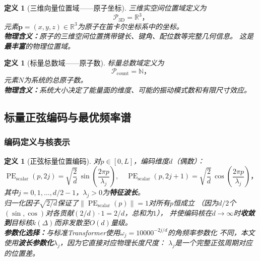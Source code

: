 \documentclass[11pt,a4paper]{article}
\newtheorem{definition}[theorem]{定义}
\theoremstyle{remark}
\DeclareMathOperator{\PE}{PE}
\newcommand{\R}{\mathbb{R}}
\newcommand{\N}{\mathbb{N}}
\newcommand{\Ppos}{\mathcal{P}}
\begin{document}
\begin{definition}[三维向量位置域——原子坐标]
\label{def:1.1.2}
三维实空间位置域定义为
\begin{equation}
    \Ppos_{\text{3D}} = \R^3，
\end{equation}
元素$\mathbf{p} = (x, y, z) \in \R^3$为原子在笛卡尔坐标系中的坐标。\\
\textbf{物理含义：}原子的三维空间位置携带键长、键角、配位数等完整几何信息。
这是\textbf{最丰富}的物理位置域。
\end{definition}

\begin{definition}[标量总数域——原子数]
\label{def:1.1.3}
标量总数域定义为
\begin{equation}
    \Ppos_{\text{count}} = \N，
\end{equation}
元素$N$为系统的总原子数。\\
\textbf{物理含义：}系统大小决定了能量面的维度、可能的振动模式数和有限尺寸效应。
\end{definition}

\subsection{标量正弦编码与最优频率谱}

\subsubsection{编码定义与核表示}

\begin{definition}[正弦标量位置编码]
\label{def:1.2.1}
对$p \in [0, L]$，编码维度$d$（偶数）：
\begin{equation}
    \boxed{
    \PE_{\text{scalar}}(p, 2j) = \sqrt{\frac{2}{d}}\,\sin\!\left(\frac{2\pi p}{\lambda_j}\right),\quad
    \PE_{\text{scalar}}(p, 2j+1) = \sqrt{\frac{2}{d}}\,\cos\!\left(\frac{2\pi p}{\lambda_j}\right)
    }，
\end{equation}
其中$j = 0, 1, \ldots, d/2-1$，$\lambda_j > 0$为\textbf{特征波长}。\\
归一化因子$\sqrt{2/d}$保证了$\|\PE_{\text{scalar}}(p)\| = 1$对所有$p$恒成立
（因为$d/2$个$(\sin,\cos)$对各贡献$(2/d) \cdot 1 = 2/d$，总和为$1$），
并使编码核在$d \to \infty$时\textbf{收敛到}目标核$k(\Delta)$而非发散至$O(d)$量级。\\
\textbf{参数化选择：}与标准Transformer使用$\omega_j = 10000^{-2j/d}$的角频率参数化
不同，本文使用\textbf{波长参数化}$\lambda_j$，因为它直接对应物理长度尺度：
$\lambda_j$是一个完整正弦周期对应的位置差。
\end{definition}
\end{document}
